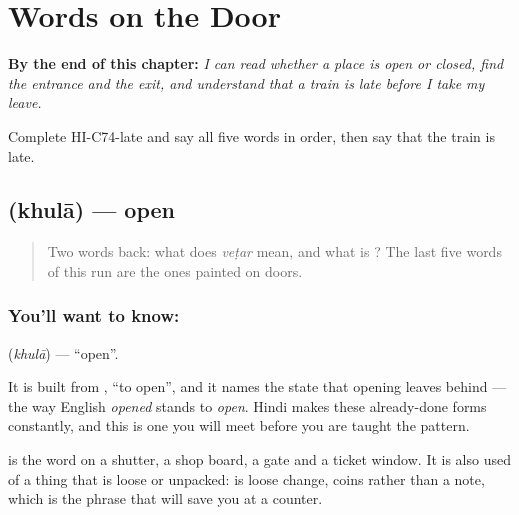 
\chapter{Words on the Door}
\label{ch:hi-words-on-the-door}

\begin{chapteropening}
\textbf{By the end of this chapter:} \emph{I can read whether a place is open or closed, find the entrance and the exit, and understand that a train is late before I take my leave.}

Complete HI-C74-late and say all five words in order, then say that the train is late.
\end{chapteropening}

\section[khulā]{ (khulā) — open}

\label{lesson:HI-C74-open}



\begin{quote}
Two words back: what does \emph{veṭar} mean, and what is \textbf{}? The last five words of this run are the ones painted on doors.
\end{quote}

\subsection*{You'll want to know: }
\textbf{} (\emph{khulā}) — \textquotedblleft{}open\textquotedblright{}.

It is built from \textbf{}, \textquotedblleft{}to open\textquotedblright{}, and it names the state that opening leaves behind — the way English \emph{opened} stands to \emph{open}. Hindi makes these already-done forms constantly, and this is one you will meet before you are taught the pattern.

 is the word on a shutter, a shop board, a gate and a ticket window. It is also used of a thing that is loose or unpacked: \textbf{ } is loose change, coins rather than a note, which is the phrase that will save you at a counter.

